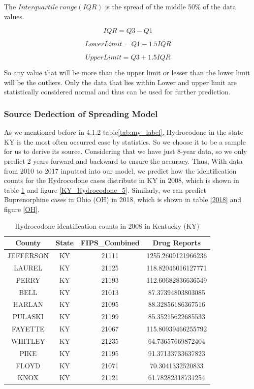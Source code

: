 \documentclass{mcmthesis}
\begin{document}
The $Interquartile~range \left(IQR\right)$ is the spread of the middle 50\% of the data values.

\begin{equation}
    IQR=Q3-Q1
\end{equation}

\begin{equation}
    Lower Limit = Q1-1.5IQR
\end{equation}

\begin{equation}
    Upper Limit = Q3+1.5IQR
\end{equation}

So any value that will be more than the upper limit or lesser than the lower limit will be the outliers. Only the data that lies within Lower and upper limit are statistically considered normal and thus can be used for further prediction.

\subsubsection{Source Dedection of Spreading Model}
\label{sec: Implementation}

As we mentioned before in 4.1.2 table\ref{tab:my_label}, Hydrocodone in the state KY is the most often occurred case by statistics. So we choose it to be a sample for us to derive its source. Considering that we have just 8-year data, so we only predict 2 years forward and backward to ensure the accuracy. Thus, With data from 2010 to 2017 inputted into our model, we predict how the identification counts for the Hydrocodone cases distribute in KY in 2008, which is shown in table \ref{tab:2008} and figure \ref{KY_Hydrocodone_5}. Similarly, we can predict Buprenorphine cases in Ohio (OH) in 2018, which is shown in table \ref{2018} and figure \ref{OH}.

\begin{table}[H]
    \centering  
    \caption{Hydrocodone identification counts in 2008 in  Kentucky (KY)}
    \label{tab:2008}
    \begin{tabular}{|c|c|c|c|}
        \hline
County&State & FIPS\_Combined & Drug Reports  \\\hline
JEFFERSON&KY&21111&1255.2609121966236\\
LAUREL&KY&21125&118.82046016127771\\
PERRY&KY&21193&112.60682836636549\\
BELL&KY&21013&87.37394803803085\\
HARLAN&KY&21095&88.32856186367516\\
PULASKI&KY&21199&85.35215622685533\\
FAYETTE&KY&21067&115.80939466255792\\
WHITLEY&KY&21235&64.73657669872404\\
PIKE&KY&21195&91.37133733637823\\
FLOYD&KY&21071&70.3041332520833\\
KNOX&KY&21121&61.78282318731254\\
\hline
    \end{tabular}
\end{table} 
\end{document}
